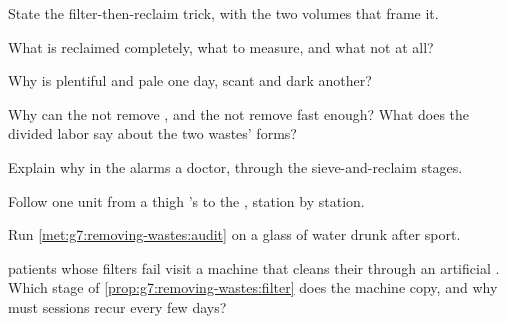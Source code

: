 \begin{exercise}[$\star$]\label{exo:g7:removing-wastes:4}
State the filter-then-reclaim trick, with the two
volumes that frame it.
\end{exercise}

\begin{exercise}[$\star$]\label{exo:g7:removing-wastes:5}
What is reclaimed completely, what to measure, and what
not at all?
\end{exercise}

\begin{exercise}[$\star$]\label{exo:g7:removing-wastes:6}
Why is  plentiful and pale one day, scant and dark
another?
\end{exercise}

\begin{exercise}[$\star\star$]\label{exo:g7:removing-wastes:7}
Why can the  not remove , and the  not
remove  fast enough? What does the divided
labor say about the two wastes' forms?
\end{exercise}

\begin{exercise}[$\star\star$]\label{exo:g7:removing-wastes:8}
Explain why  in the  alarms a doctor,
through the sieve-and-reclaim stages.
\end{exercise}

\begin{exercise}[$\star\star$]\label{exo:g7:removing-wastes:9}
Follow one  unit from a thigh 's  to
the , station by station.
\end{exercise}

\begin{exercise}[$\star\star$]\label{exo:g7:removing-wastes:10}
Run \cref{met:g7:removing-wastes:audit} on a glass of
water drunk after sport.
\end{exercise}

\begin{exercise}[$\star\star$]\label{exo:g7:removing-wastes:11}
 patients whose filters fail visit a machine that
cleans their  through an artificial .
Which stage of \cref{prop:g7:removing-wastes:filter}
does the machine copy, and why must sessions recur
every few days?
\end{exercise}

